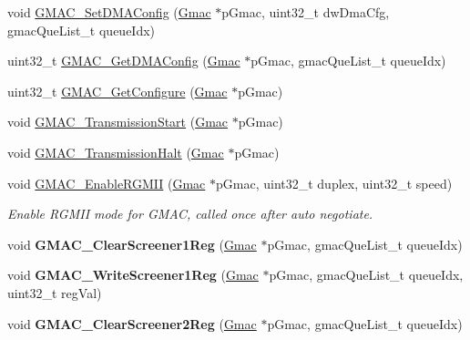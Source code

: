 \begin{DoxyCompactItemize}
\item 
void \mbox{\hyperlink{group__gmac__defines_gab9a3c958b148a17ac3bff5cbc107b3bc}{G\+M\+A\+C\+\_\+\+Set\+D\+M\+A\+Config}} (\mbox{\hyperlink{structGmac}{Gmac}} $\ast$p\+Gmac, uint32\+\_\+t dw\+Dma\+Cfg, gmac\+Que\+List\+\_\+t queue\+Idx)
\item 
uint32\+\_\+t \mbox{\hyperlink{group__gmac__defines_gad60942eb57cf6c8f9b4cc3e527f58fa7}{G\+M\+A\+C\+\_\+\+Get\+D\+M\+A\+Config}} (\mbox{\hyperlink{structGmac}{Gmac}} $\ast$p\+Gmac, gmac\+Que\+List\+\_\+t queue\+Idx)
\item 
uint32\+\_\+t \mbox{\hyperlink{group__gmac__defines_gaf6482f0f7dd92cb6e0d8805c6cd00d5b}{G\+M\+A\+C\+\_\+\+Get\+Configure}} (\mbox{\hyperlink{structGmac}{Gmac}} $\ast$p\+Gmac)
\item 
void \mbox{\hyperlink{group__gmac__defines_ga8f5a1bfd6e130370cda5f9f15b99d4aa}{G\+M\+A\+C\+\_\+\+Transmission\+Start}} (\mbox{\hyperlink{structGmac}{Gmac}} $\ast$p\+Gmac)
\item 
void \mbox{\hyperlink{group__gmac__defines_gaec157405c56f5074b5f49268d3148c55}{G\+M\+A\+C\+\_\+\+Transmission\+Halt}} (\mbox{\hyperlink{structGmac}{Gmac}} $\ast$p\+Gmac)
\item 
void \mbox{\hyperlink{group__gmac__defines_ga144f2054229d8431f26a425ff7fd1bef}{G\+M\+A\+C\+\_\+\+Enable\+R\+G\+M\+II}} (\mbox{\hyperlink{structGmac}{Gmac}} $\ast$p\+Gmac, uint32\+\_\+t duplex, uint32\+\_\+t speed)
\begin{DoxyCompactList}\small\item\em Enable R\+G\+M\+II mode for G\+M\+AC, called once after auto negotiate. \end{DoxyCompactList}\item 
\mbox{\label{group__gmac__defines_ga093c6eb5606c5823bc104313b4b74896}} 
void {\bfseries G\+M\+A\+C\+\_\+\+Clear\+Screener1\+Reg} (\mbox{\hyperlink{structGmac}{Gmac}} $\ast$p\+Gmac, gmac\+Que\+List\+\_\+t queue\+Idx)
\item 
\mbox{\label{group__gmac__defines_ga199708b7f49f6cf2302c2f18d98e2aa2}} 
void {\bfseries G\+M\+A\+C\+\_\+\+Write\+Screener1\+Reg} (\mbox{\hyperlink{structGmac}{Gmac}} $\ast$p\+Gmac, gmac\+Que\+List\+\_\+t queue\+Idx, uint32\+\_\+t reg\+Val)
\item 
\mbox{\label{group__gmac__defines_gaabd90fa0e726568eb53e862f9fe001e7}} 
void {\bfseries G\+M\+A\+C\+\_\+\+Clear\+Screener2\+Reg} (\mbox{\hyperlink{structGmac}{Gmac}} $\ast$p\+Gmac, gmac\+Que\+List\+\_\+t queue\+Idx)

\end{DoxyCompactItemize}
